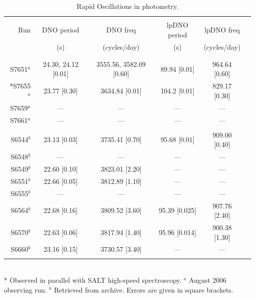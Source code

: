 \begin{table}
\begin{scriptsize}
\centering
\caption[Rapid Oscillations in photometry]{Rapid Oscillations in photometry.}
\begin{tabular}{rccccc}
\hline \hline\\
Run    & DNO period & DNO freq      & lpDNO period & lpDNO freq     \\ 
       & (s)        &  (cycles/day) &  (s)         &  (cycles/day)   \\ 
\\\hline \\
S7651$^{a}$  & 24.30, 24.12 [0.01] & 3555.56, 3582.09 [0.60] &  89.94 [0.01]  &  964.64 [0.60]  \\ 
*S7655$^{a}$ & 23.77 [0.30] & 3634.84 [0.01] & 104.2 [0.01] & 829.17 [0.30] \\ 
S7659$^{a}$  & --- & --- & --- &---\\ 
S7661$^{a}$  & --- & --- & --- &---\\
\hline\\
S6544$^{b}$  & 23.13 [0.03] & 3735.41 [0.70] & 95.68 [0.01] & 909.00 [0.40] \\
S6548$^{b}$  & ---   & ---     & ---    &---	\\
S6549$^{b}$  & 22.60 [0.10] & 3823.01 [2.20] & ---    &---	\\
S6551$^{b}$  & 22.66 [0.05] & 3812.89 [1.10] & ---    &---	 \\
S6555$^{b}$  & ---   & ---     & ---    &---	 \\
S6564$^{b}$  & 22.68 [0.16] & 3809.52 [3.60] & 95.39 [0.025] & 907.76 [2.40]  \\
S6570$^{b}$  & 22.63 [0.06] & 3817.94 [1.40] & 95.96 [0.014]  & 900.38 [1.30] \\
S6660$^{b}$  & 23.16 [0.15] & 3730.57 [3.40] & ---    &---     \\\\

\hline




\end{tabular}\\
* Observed in parallel with SALT high-speed spectroscopy. $^{a}$ August 2006 observing run. $^{b}$ Retrieved from archive. Errors are given in square brackets.

\label{RO_table}
\end{scriptsize}
\end{table}

